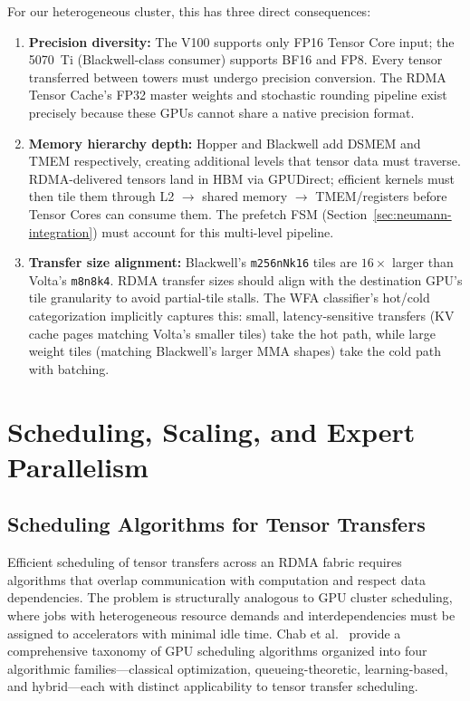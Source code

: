 \documentclass[11pt,letterpaper]{article}
\theoremstyle{definition}
\begin{document}
For our heterogeneous cluster, this has three direct consequences:
\begin{enumerate}
    \item \textbf{Precision diversity:} The V100 supports only FP16 Tensor Core input; the 5070~Ti (Blackwell-class consumer) supports BF16 and FP8. Every tensor transferred between towers must undergo precision conversion. The RDMA Tensor Cache's FP32 master weights and stochastic rounding pipeline exist precisely because these GPUs cannot share a native precision format.

    \item \textbf{Memory hierarchy depth:} Hopper and Blackwell add DSMEM and TMEM respectively, creating additional levels that tensor data must traverse. RDMA-delivered tensors land in HBM via GPUDirect; efficient kernels must then tile them through L2 $\to$ shared memory $\to$ TMEM/registers before Tensor Cores can consume them. The prefetch FSM (Section~\ref{sec:neumann-integration}) must account for this multi-level pipeline.

    \item \textbf{Transfer size alignment:} Blackwell's \texttt{m256nNk16} tiles are $16\times$ larger than Volta's \texttt{m8n8k4}. RDMA transfer sizes should align with the destination GPU's tile granularity to avoid partial-tile stalls. The WFA classifier's hot/cold categorization implicitly captures this: small, latency-sensitive transfers (KV cache pages matching Volta's smaller tiles) take the hot path, while large weight tiles (matching Blackwell's larger MMA shapes) take the cold path with batching.
\end{enumerate}

\section{Scheduling, Scaling, and Expert Parallelism}
\label{sec:scheduling-scaling}

\subsection{Scheduling Algorithms for Tensor Transfers}
\label{sec:gpu-scheduling}

Efficient scheduling of tensor transfers across an RDMA fabric requires algorithms that overlap communication with computation and respect data dependencies. The problem is structurally analogous to GPU cluster scheduling, where jobs with heterogeneous resource demands and interdependencies must be assigned to accelerators with minimal idle time. Chab et al.~\cite{gpu-scheduling-survey} provide a comprehensive taxonomy of GPU scheduling algorithms organized into four algorithmic families---classical optimization, queueing-theoretic, learning-based, and hybrid---each with distinct applicability to tensor transfer scheduling.
\end{document}
